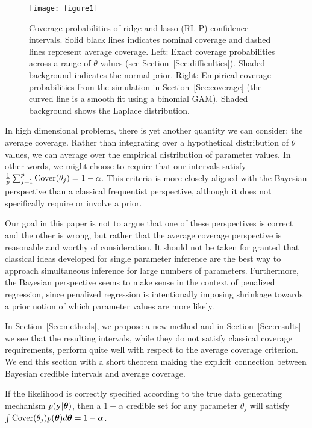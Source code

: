 \begin{figure}[htb!]
  \begin{center}
    \texttt{[image: figure1]}
    \caption{\label{fig:1}
      Coverage probabilities of ridge and lasso (RL-P) confidence intervals. Solid black lines indicates nominal coverage and dashed lines represent average coverage. Left: Exact coverage probabilities across a range of $\theta$ values (see Section~\ref{Sec:difficulties}). Shaded background indicates the normal prior. Right: Empirical coverage probabilities from the simulation in Section~\ref{Sec:coverage} (the curved line is a smooth fit using a binomial GAM). Shaded background shows the Laplace distribution.}
  \end{center}
\end{figure}

In high dimensional problems, there is yet another quantity we can consider: the average coverage. Rather than integrating over a hypothetical distribution of $\theta$ values, we can average over the empirical distribution of parameter values. In other words, we might choose to require that our intervals satisfy $\tfrac{1}{p} \sum_{j=1}^p \textrm{Cover}(\theta_j) = 1-\alpha$. This criteria is more closely aligned with the Bayesian perspective than a classical frequentist perspective, although it does not specifically require or involve a prior.

Our goal in this paper is not to argue that one of these perspectives is correct and the other is wrong, but rather that the average coverage perspective is reasonable and worthy of consideration. It should not be taken for granted that classical ideas developed for single parameter inference are the best way to approach simultaneous inference for large numbers of parameters. Furthermore, the Bayesian perspective seems to make sense in the context of penalized regression, since penalized regression is intentionally imposing shrinkage towards a prior notion of which parameter values are more likely.

In Section~\ref{Sec:methods}, we propose a new method and in Section~\ref{Sec:results} we see that the resulting intervals, while they do not satisfy classical coverage requirements, perform quite well with respect to the average coverage criterion. We end this section with a short theorem making the explicit connection between Bayesian credible intervals and average coverage.

\begin{thm}
  \label{Thm:bcc}
  If the likelihood is correctly specified according to the true data generating mechanism $p(\mathbf{y} | \boldsymbol{\theta})$, then a $1-\alpha$ credible set for any parameter $\theta_j$ will satisfy $\int \textrm{Cover}(\theta_j)p(\boldsymbol{\theta}) d\boldsymbol{\theta} = 1 - \alpha$.
\end{thm}

